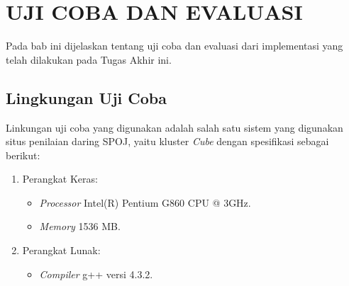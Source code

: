 \chapter{UJI COBA DAN EVALUASI}

Pada bab ini dijelaskan tentang uji coba dan evaluasi dari implementasi yang telah dilakukan pada Tugas Akhir ini.

\section{Lingkungan Uji Coba}

Linkungan uji coba yang digunakan adalah salah satu sistem yang digunakan situs penilaian daring SPOJ, yaitu kluster \textit{Cube} dengan spesifikasi sebagai berikut:

\begin{enumerate}
	\item Perangkat Keras:
	\begin{itemize}
		\item \textit{Processor} Intel(R) Pentium G860 CPU @ 3GHz.
		\item \textit{Memory} 1536 MB.
	\end{itemize}
	\item Perangkat Lunak:
	\begin{itemize}
		\item \textit{Compiler} g++ versi 4.3.2.
	\end{itemize}			
\end{enumerate} 

